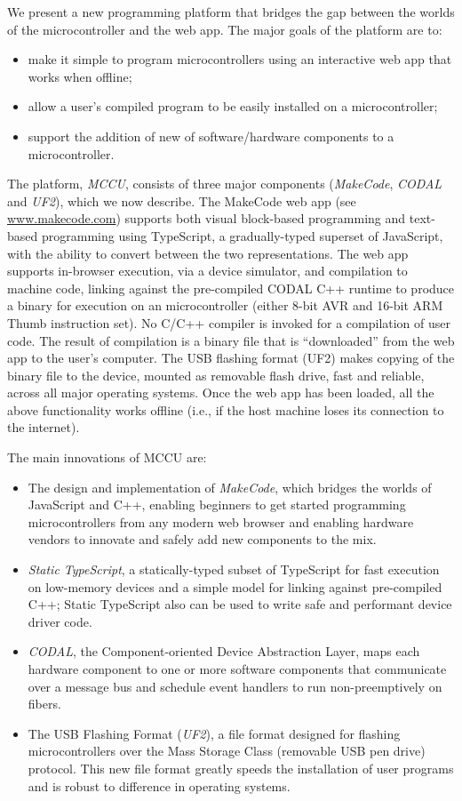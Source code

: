 We present a new programming platform that bridges the gap between the worlds of the microcontroller
and the web app. The major goals of the platform are to:
\begin{itemize}
\item make it simple to program microcontrollers using an interactive web app that works when offline;
\item allow a user's compiled program to be easily installed on a microcontroller;
\item support the addition of new of software/hardware components to a microcontroller.
\end{itemize}
The platform, \emph{MCCU}, consists of three major components (\emph{MakeCode}, \emph{CODAL} and \emph{UF2}), which we now describe. 
The MakeCode web app (see \url{www.makecode.com}) supports both visual block-based programming and text-based programming 
using TypeScript, a gradually-typed superset of JavaScript, with the ability to convert between the two representations. 
The web app supports in-browser execution, via a device simulator, and compilation to machine code, linking against the 
pre-compiled CODAL C++ runtime to produce a binary for execution on an microcontroller (either 8-bit AVR and 16-bit ARM 
Thumb instruction set). No C/C++ compiler is invoked for a compilation of user code. The result of compilation is a 
binary file that is ``downloaded'' from the web app to the user's computer. The USB flashing format (UF2) makes copying 
of the binary file to the device, mounted as removable flash drive, fast and reliable, across all major operating systems. 
Once the web app has been loaded, all the above functionality works offline (i.e., if the host machine loses its connection 
to the internet).

The main innovations of MCCU are:
\begin{itemize}
\item The design and implementation of \emph{MakeCode}, which bridges the worlds of JavaScript and C++, 
      enabling beginners to get started programming microcontrollers from any modern web browser and enabling 
      hardware vendors to innovate and safely add new components to the mix. 
\item \emph{Static TypeScript}, a statically-typed subset of TypeScript for fast execution on low-memory devices 
      and a simple model for linking against pre-compiled C++; Static TypeScript also can be used to write safe 
      and performant device driver code.
\item \emph{CODAL}, the Component-oriented Device Abstraction Layer, maps each hardware component to one or more 
      software components that communicate over a message bus and schedule event handlers to run non-preemptively on fibers. 
\item The USB Flashing Format (\emph{UF2}), a file format designed for flashing microcontrollers over the Mass Storage
      Class (removable USB pen drive) protocol.  This new file format greatly speeds the installation of user programs
      and is robust to difference in operating systems.
\end{itemize}

